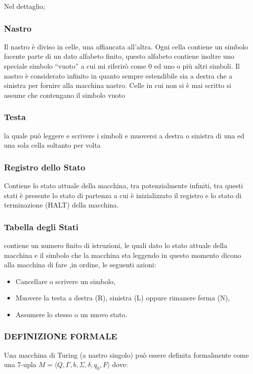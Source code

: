\documentclass[12pt, a4paper, oneside]{article}
\begin{document}
Nel dettaglio;

\subsubsection*{Nastro}
Il nastro è diviso in celle, una affiancata all’altra. Ogni cella contiene un simbolo facente parte di un dato alfabeto finito, questo alfabeto contiene inoltre uno speciale simbolo ``vuoto'' a cui mi riferirò come 0 ed uno o più altri simboli.
Il nastro è considerato infinito in quanto sempre estendibile sia a destra che a sinistra per fornire alla macchina nastro. Celle in cui non si è mai scritto si assume che contengano il simbolo vuoto

\subsubsection*{Testa}
la quale può leggere e scrivere i simboli e muoversi a destra o sinistra di una ed una sola cella soltanto per volta

\subsubsection*{Registro dello Stato}
Contiene lo stato attuale della macchina, tra potenzialmente infiniti, tra questi stati è presente lo stato di partenza a cui è inizializzato il registro e lo stato di terminazione (HALT) della macchina.

\subsubsection*{Tabella degli Stati}
contiene un numero finito di istruzioni, le quali dato lo stato attuale della macchina e il simbolo che la macchina sta leggendo in questo momento dicono alla macchina di fare ,in ordine, le seguenti azioni:
\begin{itemize}
    \item Cancellare o scrivere un simbolo,
    \item Muovere la testa a destra (R), sinistra (L) oppure rimanere ferma (N),
    \item Assumere lo stesso o un nuovo stato.
\end{itemize}

\subsubsection*{DEFINIZIONE FORMALE}
Una macchina di Turing (a nastro singolo) può essere definita formalmente come una 7-upla $M = \langle Q, \Gamma, b, \Sigma, \delta, q_0, F \rangle$ dove:
\end{document}
